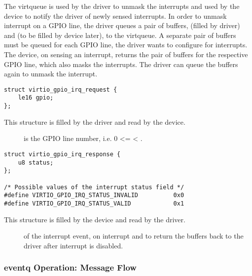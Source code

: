 The  virtqueue is used by the driver to unmask the interrupts and
used by the device to notify the driver of newly sensed interrupts. In order to
unmask interrupt on a GPIO line, the driver queues a pair of buffers,
 (filled by driver) and  (to be filled by device later), to the 
virtqueue. A separate pair of buffers must be queued for each GPIO line, the
driver wants to configure for interrupts. The device, on sensing an interrupt,
returns the pair of buffers for the respective GPIO line, which also masks the
interrupts. The driver can queue the buffers again to unmask the interrupt.

\begin{lstlisting}
struct virtio_gpio_irq_request {
    le16 gpio;
};
\end{lstlisting}

This structure is filled by the driver and read by the device.

\begin{description}
\item[] is the GPIO line number, i.e. 0 <=  <
    .
\end{description}

\begin{lstlisting}
struct virtio_gpio_irq_response {
    u8 status;
};

/* Possible values of the interrupt status field */
#define VIRTIO_GPIO_IRQ_STATUS_INVALID          0x0
#define VIRTIO_GPIO_IRQ_STATUS_VALID            0x1
\end{lstlisting}

This structure is filled by the device and read by the driver.

\begin{description}
\item[] of the interrupt event,
     on interrupt and
     to return the buffers back to the
    driver after interrupt is disabled.
\end{description}

\subsubsection{eventq Operation: Message Flow}\label{sec:Device Types / GPIO Device / eventq Operation / Message Flow}

